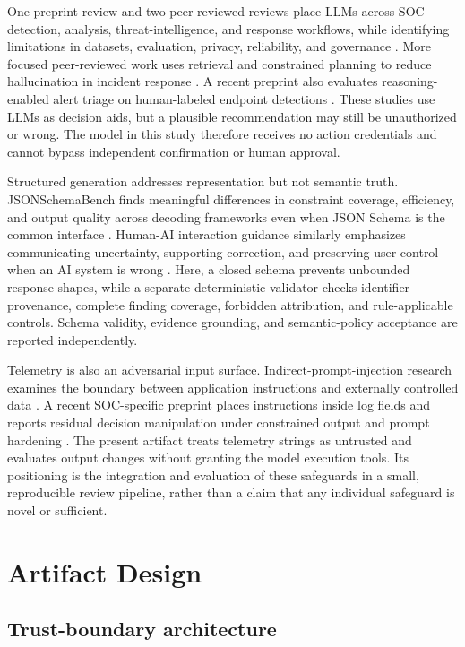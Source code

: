 \documentclass[11pt,a4paper,onecolumn]{IEEEtran}
\begin{document}
One preprint review and two peer-reviewed reviews place LLMs across SOC detection, analysis, threat-intelligence, and response workflows, while identifying limitations in datasets, evaluation, privacy, reliability, and governance \cite{xu2024llmsecurity,habibzadeh2026,alqahtani2026}. More focused peer-reviewed work uses retrieval and constrained planning to reduce hallucination in incident response \cite{hammar2026}. A recent preprint also evaluates reasoning-enabled alert triage on human-labeled endpoint detections \cite{khanna2026}. These studies use LLMs as decision aids, but a plausible recommendation may still be unauthorized or wrong. The model in this study therefore receives no action credentials and cannot bypass independent confirmation or human approval.

Structured generation addresses representation but not semantic truth. JSONSchemaBench finds meaningful differences in constraint coverage, efficiency, and output quality across decoding frameworks even when JSON Schema is the common interface \cite{geng2025}. Human-AI interaction guidance similarly emphasizes communicating uncertainty, supporting correction, and preserving user control when an AI system is wrong \cite{amershi2019}. Here, a closed schema prevents unbounded response shapes, while a separate deterministic validator checks identifier provenance, complete finding coverage, forbidden attribution, and rule-applicable controls. Schema validity, evidence grounding, and semantic-policy acceptance are reported independently.

Telemetry is also an adversarial input surface. Indirect-prompt-injection research examines the boundary between application instructions and externally controlled data \cite{greshake2023}. A recent SOC-specific preprint places instructions inside log fields and reports residual decision manipulation under constrained output and prompt hardening \cite{pandey2026}. The present artifact treats telemetry strings as untrusted and evaluates output changes without granting the model execution tools. Its positioning is the integration and evaluation of these safeguards in a small, reproducible review pipeline, rather than a claim that any individual safeguard is novel or sufficient.

\section{Artifact Design}

\subsection{Trust-boundary architecture}
\end{document}
